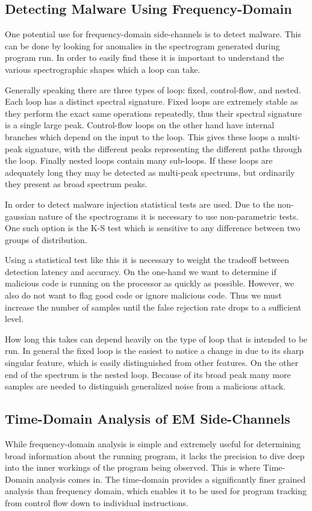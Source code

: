   \subsection{Detecting Malware Using Frequency-Domain}

    One potential use for frequency-domain side-channels is to detect malware.
    This can be done by looking for anomalies in the spectrogram generated during program run.
    In order to easily find these it is important to understand the various spectrographic shapes which a loop can take.

    Generally speaking there are three types of loop: fixed, control-flow, and nested.
    Each loop has a distinct spectral signature.
    Fixed loops are extremely stable as they perform the exact same operations repeatedly,
      thus their spectral signature is a single large peak.
    Control-flow loops on the other hand have internal branches which depend on the input to the loop.
    This gives these loops a multi-peak signature, with the different peaks representing the different paths through the loop.
    Finally nested loops contain many sub-loops. 
    If these loops are adequately long they may be detected as multi-peak spectrums, but ordinarily they present as broad spectrum peaks.

    In order to detect malware injection statistical tests are used. 
    Due to the non-gaussian nature of the spectrograms it is necessary to use non-parametric tests.
    One such option is the K-S test which is sensitive to any difference between two groups of distribution.

    Using a statistical test like this it is necessary to weight the tradeoff between detection latency and accuracy.
    On the one-hand we want to determine if malicious code is running on the processor as quickly as possible.
    However, we also do not want to flag good code or ignore malicious code.
    Thus we must increase the number of samples until the false rejection rate drops to a sufficient level.

    How long this takes can depend heavily on the type of loop that is intended to be run.
    In general the fixed loop is the easiest to notice a change in due to its sharp singular feature,
     which is easily distinguished from other features.
    On the other end of the spectrum is the nested loop.
    Because of its broad peak many more samples are needed to distinguish generalized noise from a malicious attack.

  \subsection{Time-Domain Analysis of EM Side-Channels}
    While frequency-domain analysis is simple and extremely useful for determining broad information about the running program,
      it lacks the precision to dive deep into the inner workings of the program being observed.
    This is where Time-Domain analysis comes in.
    The time-domain provides a significantly finer grained analysis than frequency domain, which enables it to be used for
      program tracking from control flow down to individual instructions.
    
